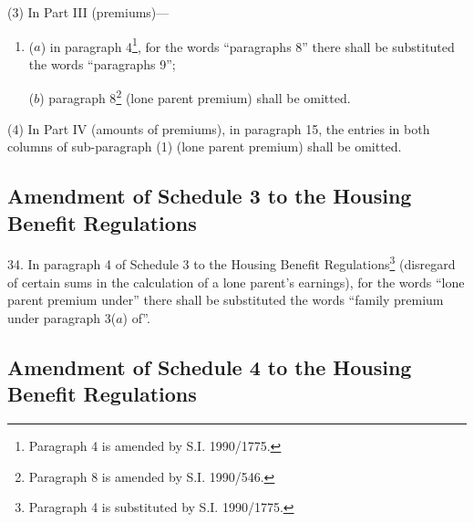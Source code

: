 \documentclass[12pt,a4paper]{article}
\begin{document}
(3) In Part III (premiums)—
\begin{enumerate}\item[]
($a$) in paragraph 4\footnote{\frenchspacing Paragraph 4 is amended by S.I. 1990/1775.}, for the words “paragraphs 8” there shall be substituted the words “paragraphs 9”;

($b$) paragraph 8\footnote{\frenchspacing Paragraph 8 is amended by S.I. 1990/546.} (lone parent premium) shall be omitted.
\end{enumerate}

(4) In Part IV (amounts of premiums), in paragraph 15, the entries in both columns of sub-paragraph (1) (lone parent premium) shall be omitted.

\subsection[34. Amendment of Schedule 3 to the Housing Benefit Regulations]{Amendment of Schedule 3 to the Housing Benefit Regulations}

34.  In paragraph 4 of Schedule 3 to the Housing Benefit Regulations\footnote{\frenchspacing Paragraph 4 is substituted by S.I. 1990/1775.} (disregard of certain sums in the calculation of a lone parent’s earnings), for the words “lone parent premium under” there shall be substituted the words “family premium under paragraph 3($a$) of”.

\subsection[35. Amendment of Schedule 4 to the Housing Benefit Regulations]{Amendment of Schedule 4 to the Housing Benefit Regulations}
\end{document}
